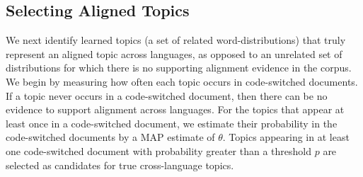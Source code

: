 \documentclass[11pt]{article}
\begin{document}

\subsection{Selecting Aligned Topics}
\label{sec:aligned_topics}
We next identify learned topics (a set of related word-distributions) that truly represent an aligned topic across
languages, as opposed to an unrelated set of distributions for which there is no supporting alignment
evidence in the corpus.
We begin by measuring how often each topic occurs in code-switched documents. If a topic never
occurs in a code-switched document, then there can be no evidence to support alignment across languages.
For the topics that appear at least once in a code-switched document,
we estimate their probability in the code-switched documents by a MAP estimate of $\theta$.
Topics appearing in at least one code-switched document with probability greater than a threshold $p$ are selected as 
candidates for true cross-language topics.
\end{document}
